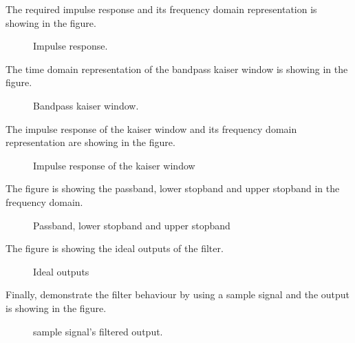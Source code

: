 \documentclass[twoside,12pt,times,onecolumn,a4paper]{report}
\begin{document}
The required impulse response and its frequency domain representation is showing in the figure.

\begin{figure}[H]
  \centering
   
  \caption{Impulse response.}
\end{figure}



The time domain representation of the bandpass kaiser window is showing in the figure.

\begin{figure}[H]
  \centering
    
  \caption{ Bandpass kaiser window.}
\end{figure}



The impulse response of the  kaiser window and its frequency domain representation are showing in the figure.

\begin{figure}[H]
  \centering
    
  \caption{ Impulse response of the  kaiser window}
\end{figure}




The figure  is showing the passband, lower stopband and upper stopband in the frequency domain.

\begin{figure}[H]
  \centering
    
  \caption{Passband, lower stopband and upper stopband}
\end{figure}



The figure  is showing the ideal outputs of the filter.

\begin{figure}[H]
  \centering
    
  \caption{ Ideal outputs}
\end{figure}



Finally, demonstrate the filter behaviour by using a sample signal and the output is showing in the figure.

\begin{figure}[H]
  \centering
   
  \caption{sample signal's filtered output.}
\end{figure}
\end{document}
